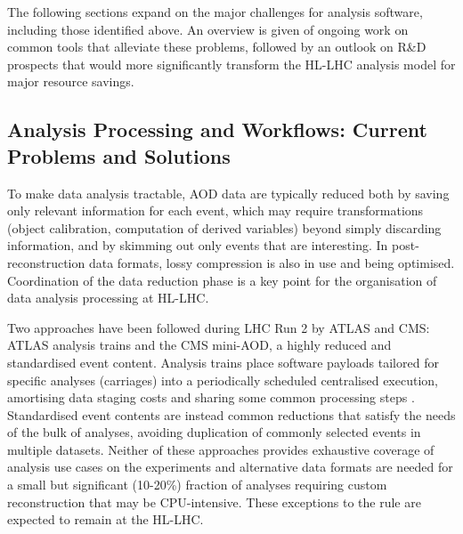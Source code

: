 \documentclass[11pt,a4paper]{article}
\begin{document}
The following sections expand on the major challenges for analysis
software, including those identified above. An overview is given of
ongoing work on common tools that alleviate these problems, followed by
an outlook on R\&D prospects that would more significantly transform the
HL-LHC analysis model for major resource savings.

\hypertarget{analysis-processing-and-workflows-current-problems-and-solutions}{%
\subsection{Analysis Processing and Workflows: Current Problems and
Solutions}\label{analysis-processing-and-workflows-current-problems-and-solutions}}

To make data analysis tractable, AOD data are typically reduced both by
saving only relevant information for each event, which may require
transformations (object calibration, computation of derived variables)
beyond simply discarding information, and by skimming out only events
that are interesting. In post-reconstruction data formats, lossy
compression is also in use and being optimised. Coordination of the data
reduction phase is a key point for the organisation of data analysis
processing at HL-LHC.

Two approaches have been followed during LHC Run 2 by ATLAS and CMS:
ATLAS analysis trains \cite{Ref4} and the CMS mini-AOD, a highly reduced and
standardised event content. Analysis trains place software payloads
tailored for specific analyses (carriages) into a periodically scheduled
centralised execution, amortising data staging costs and sharing some
common processing steps \cite{Ref3}. Standardised event contents are instead
common reductions that satisfy the needs of the bulk of analyses,
avoiding duplication of commonly selected events in multiple datasets.
Neither of these approaches provides exhaustive coverage of analysis use
cases on the experiments and alternative data formats are needed for a
small but significant (10-20\%) fraction of analyses requiring custom
reconstruction that may be CPU-intensive. These exceptions to the rule
are expected to remain at the HL-LHC.
\end{document}
